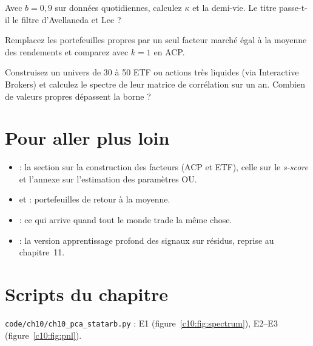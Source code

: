 \begin{exercise}
Avec $b = 0{,}9$ sur données quotidiennes, calculez $\kappa$ et la demi-vie. Le titre passe-t-il le filtre d'Avellaneda et Lee ?
\end{exercise}

\begin{exercise}[à coder]
Remplacez les portefeuilles propres par un seul facteur \og marché\fg{} égal à la moyenne des rendements et comparez avec $k = 1$ en ACP.
\end{exercise}

\begin{exercise}
Construisez un univers de 30 à 50 ETF ou actions très liquides (via Interactive Brokers) et calculez le spectre de leur matrice de corrélation sur un an. Combien de valeurs propres dépassent la borne ?
\end{exercise}

\section{Pour aller plus loin}

\begin{toread}
\begin{itemize}[leftmargin=1.2em]
\item \citet{avellaneda2010} : la section sur la construction des facteurs (ACP et ETF), celle sur le \emph{s-score} et l'annexe sur l'estimation des paramètres OU.
\item \citet{boxtiao1977} et \citet{daspremont2011} : portefeuilles de retour à la moyenne.
\item \citet{khandanilo2011} : ce qui arrive quand tout le monde trade la même chose.
\item \citet{guijarro2021} : la version \og apprentissage profond\fg{} des signaux sur résidus, reprise au chapitre~11.
\end{itemize}
\end{toread}

\section{Scripts du chapitre}
\noindent\texttt{code/ch10/ch10\_pca\_statarb.py} : E1 (figure~\ref{c10:fig:spectrum}), E2–E3 (figure~\ref{c10:fig:pnl}).
